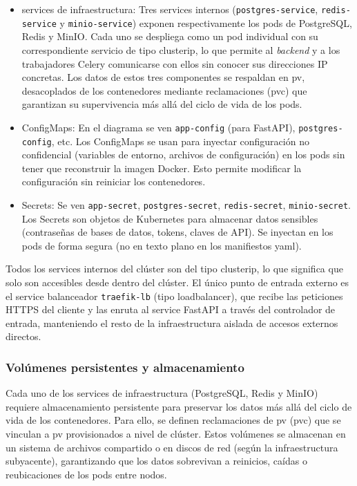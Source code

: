 \begin{itemize}
    \item \gls{service}s de infraestructura: Tres \gls{service}s internos (\texttt{postgres-service},
    \texttt{redis-service} y \texttt{minio-service}) exponen respectivamente los \gls{pod}s de PostgreSQL, 
    Redis y MinIO. Cada uno se despliega como un \gls{pod} individual con su correspondiente 
    servicio de tipo \gls{clusterip}, lo que permite al \textit{backend} y a los trabajadores 
    Celery comunicarse con ellos sin conocer sus direcciones \ac{IP} concretas. Los datos de 
    estos tres componentes se respaldan en \gls{pv}, desacoplados de los
    contenedores mediante reclamaciones (\gls{pvc}) que garantizan su supervivencia más allá
    del ciclo de vida de los \gls{pod}s.

    \item \gls{ConfigMap}s: En el diagrama se ven \texttt{app-config} (para FastAPI), \texttt{postgres-config}, etc. 
    Los \gls{ConfigMap}s se usan para inyectar configuración no confidencial (variables de entorno, 
    archivos de configuración) en los \gls{pod}s sin tener que reconstruir la imagen Docker. 
    Esto permite modificar la configuración sin reiniciar los contenedores.

    \item \gls{Secret}s: Se ven \texttt{app-secret}, \texttt{postgres-secret}, \texttt{redis-secret}, \texttt{minio-secret}. Los \gls{Secret}s 
    son objetos de Kubernetes para almacenar datos sensibles (contraseñas de bases de datos, tokens, 
    claves de \ac{API}). Se inyectan en los \gls{pod}s de forma segura (no en texto plano en los manifiestos \gls{yaml}).
\end{itemize}

Todos los \gls{service}s internos del \gls{clúster} son del tipo \gls{clusterip}, lo 
que significa que solo son accesibles desde dentro del \gls{clúster}. El único punto de 
entrada externo es el \gls{service} balanceador \texttt{traefik-lb} 
(tipo \gls{loadbalancer}), que recibe las peticiones \ac{HTTPS} del cliente y las enruta 
al \gls{service} FastAPI a través del controlador de entrada, manteniendo el resto de 
la infraestructura aislada de accesos externos directos.

\subsubsection{Volúmenes persistentes y almacenamiento}

Cada uno de los \gls{service}s de infraestructura (PostgreSQL, Redis y MinIO) requiere almacenamiento
persistente para preservar los datos más allá del ciclo de vida de los contenedores. Para ello,
se definen reclamaciones de \gls{pv} (\gls{pvc}) que se vinculan a \gls{pv}
provisionados a nivel de \gls{clúster}. Estos volúmenes se almacenan en un sistema de archivos
compartido o en discos de red (según la infraestructura subyacente), garantizando que los
datos sobrevivan a reinicios, caídas o reubicaciones de los \gls{pod}s entre \gls{nodo}s.

